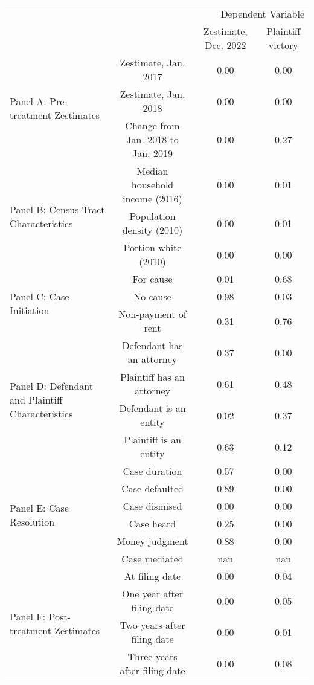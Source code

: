 \begin{tabular}{lccc}
\toprule
 &  & \multicolumn{2}{r}{Dependent Variable} \\
 &  & Zestimate, Dec. 2022 & Plaintiff victory \\
\midrule
\multirow[c]{3}{*}{Panel A: Pre-treatment Zestimates} & Zestimate, Jan. 2017 & 0.00 & 0.00 \\
 & Zestimate, Jan. 2018 & 0.00 & 0.00 \\
 & Change from Jan. 2018 to Jan. 2019 & 0.00 & 0.27 \\
\multirow[c]{3}{*}{Panel B: Census Tract Characteristics} & Median household income (2016) & 0.00 & 0.01 \\
 & Population density (2010) & 0.00 & 0.01 \\
 & Portion white (2010) & 0.00 & 0.00 \\
\multirow[c]{3}{*}{Panel C: Case Initiation} & For cause & 0.01 & 0.68 \\
 & No cause & 0.98 & 0.03 \\
 & Non-payment of rent & 0.31 & 0.76 \\
\multirow[c]{4}{*}{Panel D: Defendant and Plaintiff Characteristics} & Defendant has an attorney & 0.37 & 0.00 \\
 & Plaintiff has an attorney & 0.61 & 0.48 \\
 & Defendant is an entity & 0.02 & 0.37 \\
 & Plaintiff is an entity & 0.63 & 0.12 \\
\multirow[c]{6}{*}{Panel E: Case Resolution} & Case duration & 0.57 & 0.00 \\
 & Case defaulted & 0.89 & 0.00 \\
 & Case dismised & 0.00 & 0.00 \\
 & Case heard & 0.25 & 0.00 \\
 & Money judgment & 0.88 & 0.00 \\
 & Case mediated & nan & nan \\
\multirow[c]{4}{*}{Panel F: Post-treatment Zestimates} & At filing date & 0.00 & 0.04 \\
 & One year after filing date & 0.00 & 0.05 \\
 & Two years after filing date & 0.00 & 0.01 \\
 & Three years after filing date & 0.00 & 0.08 \\
\bottomrule
\end{tabular}
